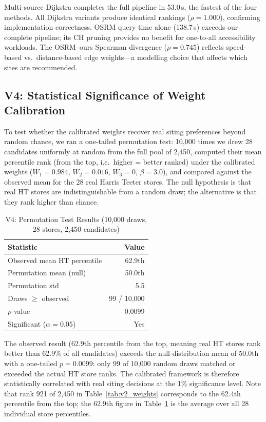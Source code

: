 \documentclass[conference]{IEEEtran}
\begin{document}
Multi-source Dijkstra completes the full pipeline in 53.0\,s, the fastest of the four methods.  All Dijkstra variants produce identical rankings ($\rho = 1.000$), confirming implementation correctness.  OSRM query time alone (138.7\,s) exceeds our complete pipeline; its CH pruning provides no benefit for one-to-all accessibility workloads.  The OSRM--ours Spearman divergence ($\rho = 0.745$) reflects speed-based vs.\ distance-based edge weights---a modelling choice that affects which sites are recommended.

\subsection{V4: Statistical Significance of Weight Calibration}
\label{sec:v4}

To test whether the calibrated weights recover real siting preferences
beyond random chance, we ran a one-tailed permutation test:
10{,}000 times we drew 28 candidates uniformly at random from the full
pool of 2{,}450, computed their mean percentile rank (from the top,
i.e.\ higher = better ranked) under the calibrated weights
($W_1=0.984$, $W_2=0.016$, $W_3=0$, $\beta=3.0$), and compared against
the observed mean for the 28 real Harris Teeter stores.  The null
hypothesis is that real HT stores are indistinguishable from a random
draw; the alternative is that they rank higher than chance.

\begin{table}[!t]
\centering
\caption{V4: Permutation Test Results (10{,}000 draws, 28 stores, 2{,}450 candidates)}
\label{tab:v4_permutation}
\begin{tabular}{lr}
\toprule
\textbf{Statistic} & \textbf{Value} \\
\midrule
Observed mean HT percentile   & 62.9th \\
Permutation mean (null)        & 50.0th \\
Permutation std                & 5.5 \\
Draws $\geq$ observed          & 99 / 10{,}000 \\
$p$-value                      & 0.0099 \\
Significant ($\alpha = 0.05$)  & Yes \\
\bottomrule
\end{tabular}
\end{table}

The observed result (62.9th percentile from the top, meaning real HT
stores rank better than 62.9\% of all candidates) exceeds the
null-distribution mean of 50.0th with a one-tailed $p = 0.0099$: only
99 of 10{,}000 random draws matched or exceeded the actual HT store
ranks.  The calibrated framework is therefore statistically correlated
with real siting decisions at the 1\% significance level.  Note that
rank 921 of 2{,}450 in Table~\ref{tab:v2_weights} corresponds to the
62.4th percentile from the top; the 62.9th figure in Table~\ref{tab:v4_permutation}
is the average over all 28 individual store percentiles.
\end{document}

